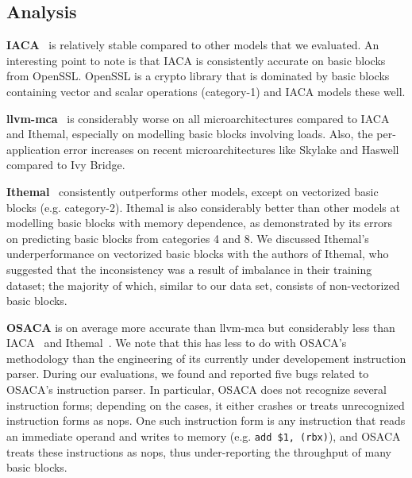 \subsection{Analysis}
 
 
 \textbf{IACA}~\cite{iaca} is relatively stable compared to other models that we evaluated.
An interesting point to note is that IACA is consistently accurate on basic blocks from OpenSSL. 
OpenSSL is a crypto library that is dominated by basic blocks containing vector and scalar operations
(category-1) and IACA models these well. 

    \textbf{llvm-mca}~\cite{llvm-mca} is considerably worse on all microarchitectures compared to IACA and Ithemal,
especially on modelling basic blocks involving loads. Also, the per-application error increases on recent microarchitectures like Skylake and Haswell compared to Ivy Bridge.

\textbf{Ithemal}~\cite{ithemal} consistently outperforms other models, except on vectorized basic blocks (e.g. category-2).
Ithemal is also considerably better than other models at modelling basic blocks with memory dependence,
as demonstrated by its errors on predicting basic blocks from categories 4 and 8.
We discussed Ithemal's underperformance on vectorized basic blocks with the authors of Ithemal, who suggested that the inconsistency
was a result of imbalance in their training dataset;
the majority of which, similar to our data set, consists of non-vectorized basic blocks.

\textbf{OSACA}\cite{osaca} is on average more accurate than llvm-mca but
considerably less than IACA~\cite{iaca} and Ithemal~\cite{ithemal}.
We note that this has less to do with OSACA's methodology than the engineering of its currently under developement instruction parser.
During our evaluations, we found and reported five bugs related to OSACA's instruction parser.
In particular, OSACA does not recognize several instruction forms;
depending on the cases, it either crashes or treats unrecognized instruction forms as nops.
One such instruction form is any instruction that reads an immediate operand and writes to memory
(e.g. \verb|add $1, (rbx)|), and OSACA treats these instructions as nops, thus under-reporting the throughput of
many basic blocks.

